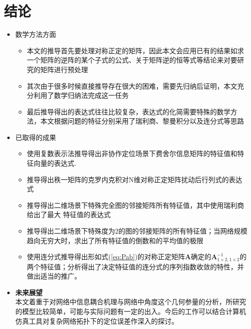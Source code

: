 \chapter{结论}\label{cha:content5}

  \begin{itemize}
  \item
  数学方法方面
  \begin{itemize}
  \item 本文的推导首先要处理对称正定的矩阵，因此本文会应用已有的结果如求一个矩阵的逆阵的某个子式的公式、关于矩阵逆的恒等式等结论来对要研究的矩阵进行预处理
  \item 其次由于很多时候直接推导存在很大的困难，需要先归纳后证明，本文充分利用了数学归纳法完成这一任务
  \item 最后推导得出的表达式往往比较复杂，表达式的化简需要特殊的数学方法，本文根据问题的特征分别采用了瑞利商、黎曼积分以及连分式等思路
  \end{itemize}
  \item
    已取得的成果
  \begin{itemize}
  \item
    使用复数表示法推导得出非协作定位场景下费舍尔信息矩阵的特征值和特征向量的表达式.
  \item
    推导得出秩一矩阵的克罗内克积对N维对称正定矩阵扰动后行列式的表达式
  \item
    推导得出二维场景下特殊完全图的邻接矩阵所有特征值，其中使用瑞利商给出了最大 特征值的表达式
  \item 推导得出二维场景下特殊度为2的图的邻接矩阵的所有特征值；当网络规模趋向无穷大时，求出了所有特征值的倒数和的平均值的极限
  \item 使用连分式推导得出形如式(\ref{eq:Pab})的对称正定矩阵$\bm{A}$确定的$\bm{A}^{-1}_{1\times2,1\times2}$的两个特征值；分析得出了决定特征值的连分式的序列指数收敛的特性，并做出适当的推广。
  \end{itemize}
  \item \textbf{未来展望}\\
  本文着重于对网络中信息耦合机理与网络中角度这个几何参量的分析，所研究的模型比较简单，可能与实际问题有一定的出入。今后的工作可以结合计算机仿真工具对复杂网络拓扑下的定位误差作深入的探讨。
  \end{itemize}
